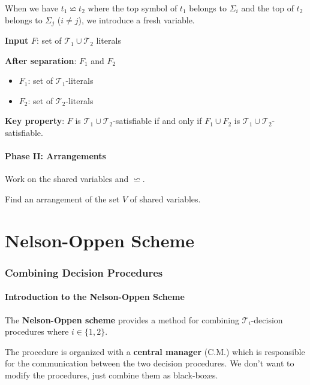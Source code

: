 \documentclass[11pt,a4paper]{article}
\theoremstyle{definition}
\theoremstyle{plain}
\theoremstyle{remark}
\begin{document}
When we have $t_1 \backsimeq t_2$ where the top symbol of $t_1$ belongs to $\Sigma_i$ and the top of $t_2$ belongs to $\Sigma_j$ ($i \neq j$), we introduce a fresh variable.

\begin{tcolorbox}[colback=green!5!white,colframe=green!75!black,title=\textbf{Separation Process}]
\textbf{Input} $F$: set of $\mathcal{T}_1 \cup \mathcal{T}_2$ literals

\textbf{After separation}: $F_1$ and $F_2$
\begin{itemize}
    \item $F_1$: set of $\mathcal{T}_1$-literals
    \item $F_2$: set of $\mathcal{T}_2$-literals
\end{itemize}

\textbf{Key property}: $F$ is $\mathcal{T}_1 \cup \mathcal{T}_2$-satisfiable if and only if $F_1 \cup F_2$ is $\mathcal{T}_1 \cup \mathcal{T}_2$-satisfiable.
\end{tcolorbox}

\subsection{Phase II: Arrangements}

Work on the shared variables and $\backsimeq$.

Find an arrangement of the set $V$ of shared variables.

\newpage


\part{Nelson-Oppen Scheme}

\section{Combining Decision Procedures}

\subsection{Introduction to the Nelson-Oppen Scheme}

The \textbf{Nelson-Oppen scheme} provides a method for combining $\mathcal{T}_i$-decision procedures where $i \in \{1, 2\}$.

The procedure is organized with a \textbf{central manager} (C.M.) which is responsible for the communication between the two decision procedures. We don't want to modify the procedures, just combine them as black-boxes.
\end{document}
